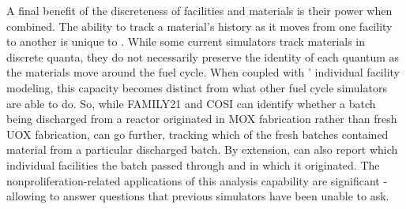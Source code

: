 A final benefit of the discreteness of facilities and materials is their power
when combined. The ability to track a material's history as it moves from one
facility to another is unique to \Cyclus. While some current simulators track
materials in discrete quanta, they do not necessarily preserve the identity of each quantum as the
materials move around the fuel cycle. When coupled with \Cyclus' individual
facility modeling, this capacity becomes distinct from what other fuel cycle
simulators are able to do. So, while FAMILY21 and \gls{COSI} can identify
whether a batch being discharged from a reactor originated in \gls{MOX}
fabrication rather than fresh \gls{UOX} fabrication, \Cyclus can go further,
tracking which of the fresh batches contained material from a particular
discharged batch. By extension, \Cyclus can also report which individual
facilities the batch passed through and in which it originated. The
nonproliferation-related applications of this analysis capability are
significant - allowing \Cyclus to answer questions that previous simulators
have been unable to ask.
